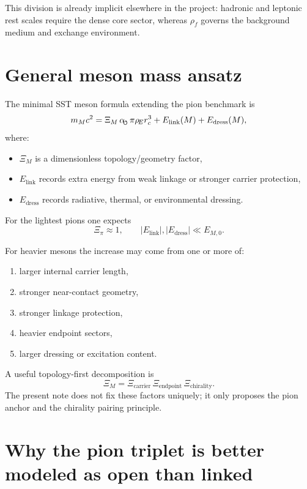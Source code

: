 \documentclass[11pt,a4paper]{article}
\newcommand{\swirlarrow}{\mathchoice{\mkern-2mu\scriptstyle\boldsymbol{\circlearrowleft}}{\mkern-2mu\scriptstyle\boldsymbol{\circlearrowleft}}{\mkern-2mu\scriptscriptstyle\boldsymbol{\circlearrowleft}}{\mkern-2mu\scriptscriptstyle\boldsymbol{\circlearrowleft}}}
\newcommand{\rhof}{\rho_{\!f}}
\newcommand{\rhoE}{\rho_{\!E}}
\newcommand{\rc}{r_c}
\newcommand{\alphasw}{\alpha_{\!\swirlarrow}}
\begin{document}
This division is already implicit elsewhere in the project: hadronic and leptonic rest scales require the dense core sector, whereas \(\rhof\) governs the background medium and exchange environment.

\section{General meson mass ansatz}
The minimal SST meson formula extending the pion benchmark is
\begin{equation}
m_{M}c^{2}
=
\Xi_{M}\,\alphasw\,\pi\rhoE\rc^{3}
+ E_{\text{link}}(M)
+ E_{\text{dress}}(M),
\label{eq:mesonmaster}
\end{equation}
where:
\begin{itemize}
    \item \(\Xi_{M}\) is a dimensionless topology/geometry factor,
    \item \(E_{\text{link}}\) records extra energy from weak linkage or stronger carrier protection,
    \item \(E_{\text{dress}}\) records radiative, thermal, or environmental dressing.
\end{itemize}

For the lightest pions one expects
\begin{equation}
\Xi_{\pi} \approx 1,
\qquad
|E_{\text{link}}|,|E_{\text{dress}}| \ll E_{M,0}.
\end{equation}

For heavier mesons the increase may come from one or more of:
\begin{enumerate}[label=(\alph*)]
    \item larger internal carrier length,
    \item stronger near-contact geometry,
    \item stronger linkage protection,
    \item heavier endpoint sectors,
    \item larger dressing or excitation content.
\end{enumerate}

A useful topology-first decomposition is
\begin{equation}
\Xi_{M}
=
\Xi_{\text{carrier}}\,\Xi_{\text{endpoint}}\,\Xi_{\text{chirality}}.
\label{eq:ximdecomp}
\end{equation}
The present note does not fix these factors uniquely; it only proposes the pion anchor and the chirality pairing principle.

\section{Why the pion triplet is better modeled as open than linked}
\end{document}
